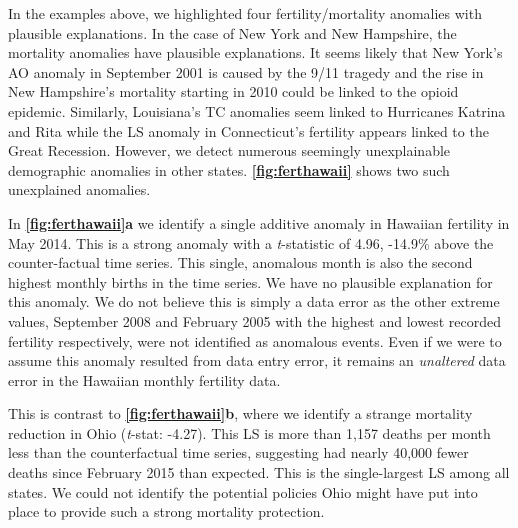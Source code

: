 \documentclass[12pt]{article}
\begin{document}
In the examples above, we highlighted four fertility/mortality anomalies
with plausible explanations. In the case of New York and New Hampshire,
the mortality anomalies have plausible explanations. It seems likely
that New York's AO anomaly in September 2001 is caused by the 9/11
tragedy and the rise in New Hampshire's mortality starting in 2010 could
be linked to the opioid epidemic. Similarly, Louisiana's TC anomalies
seem linked to Hurricanes Katrina and Rita while the LS anomaly in
Connecticut's fertility appears linked to the Great Recession. However,
we detect numerous seemingly unexplainable demographic anomalies in
other states. \textbf{\autoref{fig:ferthawaii}} shows two such
unexplained anomalies.

In \textbf{\autoref{fig:ferthawaii}a} we identify a single additive
anomaly in Hawaiian fertility in May 2014. This is a strong anomaly with
a \emph{t}-statistic of 4.96, -14.9\% above the counter-factual time
series. This single, anomalous month is also the second highest monthly
births in the time series. We have no plausible explanation for this
anomaly. We do not believe this is simply a data error as the other
extreme values, September 2008 and February 2005 with the highest and
lowest recorded fertility respectively, were not identified as anomalous
events. Even if we were to assume this anomaly resulted from data entry
error, it remains an \emph{unaltered} data error in the Hawaiian monthly
fertility data.

This is contrast to \textbf{\autoref{fig:ferthawaii}b}, where we
identify a strange mortality reduction in Ohio (\emph{t}-stat: -4.27).
This LS is more than 1,157 deaths per month less than the counterfactual
time series, suggesting had nearly 40,000 fewer deaths since February
2015 than expected. This is the single-largest LS among all states. We
could not identify the potential policies Ohio might have put into place
to provide such a strong mortality protection.
\end{document}
